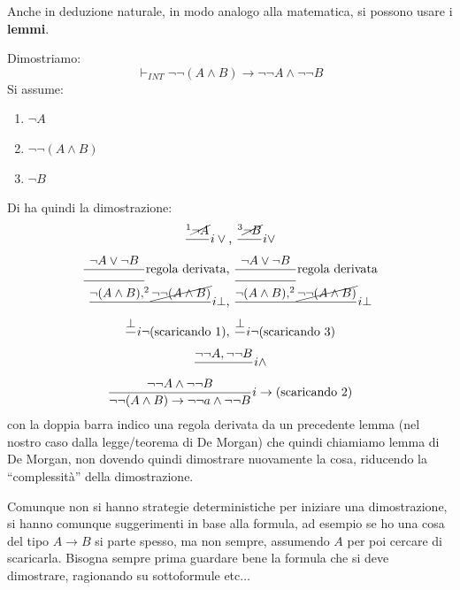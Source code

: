 \documentclass[a4paper,12pt, oneside]{book}
\begin{document}
Anche in deduzione naturale, in modo analogo alla matematica, si possono usare i
\textbf{lemmi}.
\begin{esempio}
  Dimostriamo:
  \[\vdash_{INT}\neg\neg (A\land B)\to \neg\neg A\land \neg \neg B\]
  Si assume:
  \begin{enumerate}
    \item $\neg A$
    \item $\neg\neg(A\land B)$
    \item $\neg B$
  \end{enumerate}
  Di ha quindi la dimostrazione:
  \begin{gather*}
    \frac{^1 \cancel{\neg A}}{}i\lor \mbox{, }
    \frac{^3 \cancel{\neg B}}{}i\lor\\
    \frac{\neg A\lor \neg B}{\rule{49pt}{0.4pt}}\mbox{regola derivata, }
    \frac{\neg A\lor \neg B}{\rule{49pt}{0.4pt}}\mbox{regola derivata}\\
    \frac{\neg (A\land B),^2\cancel{\neg\neg(A\land B)}}{}i\bot\mbox{, }
    \frac{\neg  (A\land B),^2\cancel{\neg\neg(A\land B)}}{}i\bot\\ 
    \frac{\bot}{}i\neg\mbox{(scaricando 1), }
    \frac{\bot}{}i\neg\mbox{(scaricando 3)}\\ 
    \frac{\neg\neg A, \neg\neg B}{}i\land\\
    \frac{\neg\neg A\land \neg\neg B}{\neg\neg (A\land B)\to \neg\neg a\land
      \neg \neg B}i\to \mbox{(scaricando 2)}
  \end{gather*}
  con la doppia barra indico una regola derivata da un precedente lemma (nel
  nostro caso dalla legge/teorema di De Morgan) che quindi chiamiamo lemma di De
  Morgan, non dovendo quindi dimostrare nuovamente la cosa, riducendo la
  ``complessità'' della dimostrazione.
\end{esempio}
Comunque non si hanno strategie deterministiche per iniziare una dimostrazione,
si hanno comunque suggerimenti in base alla formula, ad esempio se ho una cosa
del tipo $A\to B$ si parte spesso, ma non sempre, assumendo $A$ per poi cercare
di scaricarla. Bisogna sempre prima guardare bene la formula che si deve
dimostrare, ragionando su sottoformule etc$\ldots$
\end{document}
